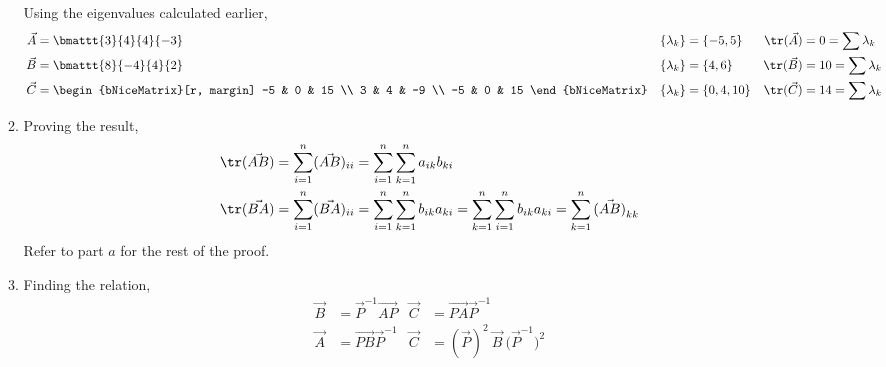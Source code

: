 \begin{enumerate}
\begin{enumerate}
                    Using the eigenvalues calculated earlier,
                    \begin{align}
                        \vec{A}       & = \bmattt{3}{4}{4}{-3}           &
                        \{\lambda_k\} & = \{-5, 5\}                      &
                        \tr(\vec{A})  & = 0 = \sum \lambda_k               \\
                        \vec{B}       & = \bmattt{8}{-4}{4}{2}           &
                        \{\lambda_k\} & = \{4, 6\}                       &
                        \tr(\vec{B})  & = 10 = \sum \lambda_k              \\
                        \vec{C}       & = \begin{bNiceMatrix}[r, margin]
                                              -5 & 0 & 15 \\
                                              3  & 4 & -9 \\
                                              -5 & 0 & 15
                                          \end{bNiceMatrix} &
                        \{\lambda_k\} & = \{0, 4, 10\}                   &
                        \tr(\vec{C})  & = 14 = \sum \lambda_k
                    \end{align}

              \item Proving the result,
                    \begin{align}
                        \tr(\vec{AB}) & = \sum_{i = 1}^{n} (\vec{AB})_{ii}
                        = \sum_{i=1}^{n} \sum_{k=1}^{n} a_{ik} b_{ki}      \\
                        \tr(\vec{BA}) & = \sum_{i = 1}^{n} (\vec{BA})_{ii}
                        = \sum_{i=1}^{n} \sum_{k=1}^{n} b_{ik} a_{ki}
                        = \sum_{k=1}^{n} \sum_{i=1}^{n} b_{ik} a_{ki}
                        = \sum_{k=1}^{n} \vec{(AB)}_{kk}
                    \end{align}
                    Refer to part $ a $ for the rest of the proof.

              \item Finding the relation,
                    \begin{align}
                        \vec{B} & = \vec{P}^{-1} \vec{AP}                           &
                        \vec{C} & = \vec{PA}\vec{P}^{-1}                              \\
                        \vec{A} & = \vec{PB}\vec{P}^{-1}                            &
                        \vec{C} & = (\vec{P})^2 \ \vec{B}\ \Big(\vec{P}^{-1}\Big)^2
                    \end{align}


\end{enumerate}
\end{enumerate}
